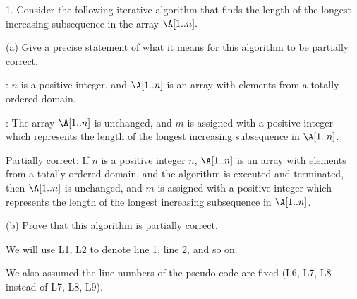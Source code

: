 \documentclass[11pt, sakura, night, 1in]{hw}
\begin{document}
1. Consider the following iterative algorithm that finds the length of the longest increasing subsequence in the array $\A[1..n].$


(a) Give a precise statement of what it means for this algorithm to be partially correct.

\Precon: $n$ is a positive integer, and $\A[1..n]$ is an array with elements from a totally ordered domain.

\Postcon: The array $\A[1..n]$ is unchanged, and $m$ is assigned with a positive integer which represents the length of the longest increasing subsequence in $\A[1..n]$.

Partially correct: If $n$ is a positive integer $n$, $\A[1..n]$ is an array with elements from a totally ordered domain, and the algorithm is executed and terminated, then $\A[1..n]$ is unchanged, and $m$ is assigned with a positive integer which represents the length of the longest increasing subsequence in $\A[1..n]$. 


(b) Prove that this algorithm is partially correct.

We will use L1, L2 to denote line 1, line 2, and so on.

We also assumed the line numbers of the pseudo-code are fixed (L6, L7, L8 instead of L7, L8, L9).

\end{document}
